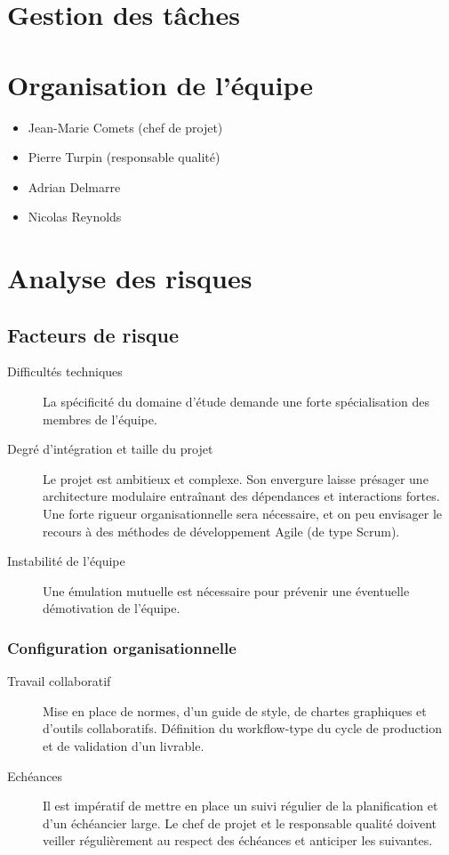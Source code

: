 \documentclass[11pt, a4paper]{article}
\begin{document}
\section{Gestion des tâches} %

\section{Organisation de l'équipe}
\begin{itemize}
    \item Jean-Marie Comets (chef de projet)
    \item Pierre Turpin (responsable qualité)
    \item Adrian Delmarre
    \item Nicolas Reynolds
\end{itemize}

\section{Analyse des risques}

\subsection{Facteurs de risque}

\begin{description}
    \item[Difficultés techniques] La spécificité du domaine d'étude demande une
        forte spécialisation des membres de l'équipe.
    \item[Degré d'intégration et taille du projet] Le projet est ambitieux et
        complexe. Son envergure laisse présager une architecture modulaire
        entraînant des dépendances et interactions fortes. Une forte rigueur
        organisationnelle sera nécessaire, et on peu envisager le recours à des
        méthodes de développement Agile (de type Scrum).
    \item[Instabilité de l'équipe] Une émulation mutuelle est nécessaire pour
        prévenir une éventuelle démotivation de l'équipe.
\end{description}

\subsubsection{Configuration organisationnelle}

\begin{description}
    \item[Travail collaboratif] Mise en place de normes, d'un guide de style,
        de chartes graphiques et d'outils collaboratifs.  Définition du
        workflow-type du cycle de production et de validation d'un livrable.
    \item[Echéances] Il est impératif de mettre en place un suivi régulier de
        la planification et d'un échéancier large. Le chef de projet et le
        responsable qualité doivent veiller régulièrement au respect des
        échéances et anticiper les suivantes.
\end{description}
\end{document}
